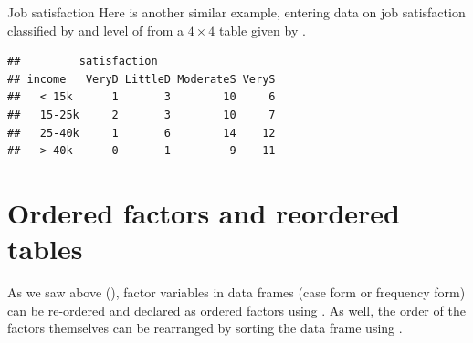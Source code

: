 \documentclass[11pt]{book}
\renewenvironment{knitrout}{\small\renewcommand{\baselinestretch}{.85}}{} %
\begin{document}
\begin{Example}[jobsat1]{Job satisfaction}
Here is another similar example, entering data on job satisfaction
classified by  and level of 
from a $4 \times 4$ table given by \citet[Table 2.8, p. 57]{Agresti:2002}.
\begin{knitrout}
\color{fgcolor}\begin{kframe}
\begin{alltt}
 \hlkwb{<-} \hlstd{(}\hlstd{(}\hlstd{,}\hlstd{,}\hlstd{,}\hlstd{,}
                   \hlstd{,}\hlstd{,}\hlstd{,}\hlstd{,}
                   \hlstd{,}\hlstd{,}\hlstd{,}\hlstd{,}
                   \hlstd{,}\hlstd{,}\hlstd{,}\hlstd{),} \hlstd{,} \hlstd{)}
 \hlkwb{=} \hlstd{(}\hlstd{=}\hlstd{(}\hlstd{,} \hlstd{,} \hlstd{,} \hlstd{),}
                \hlstd{=}\hlstd{(}\hlstd{,} \hlstd{,} \hlstd{,} \hlstd{))}
 \hlkwb{<-} 
\end{alltt}
\begin{verbatim}
##         satisfaction
## income   VeryD LittleD ModerateS VeryS
##   < 15k      1       3        10     6
##   15-25k     2       3        10     7
##   25-40k     1       6        14    12
##   > 40k      0       1         9    11
\end{verbatim}
\end{kframe}
\end{knitrout}
\end{Example}

\section{Ordered factors and reordered tables}\label{sec:ordered}
As we saw above (), factor variables in 
data frames (case form or frequency form)
can be re-ordered and declared as ordered factors using .
As well, the order of the factors themselves can be rearranged by
sorting the data frame using .
\end{document}

